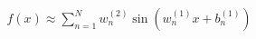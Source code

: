 \documentclass[preview]{standalone}
\begin{document}
\begin{align*}
f(x) \approx  \sum_{n=1}^{N} w_n^{(2)} \sin(w_n^{(1)}x+b_n^{(1)})
\end{align*}
\end{document}

